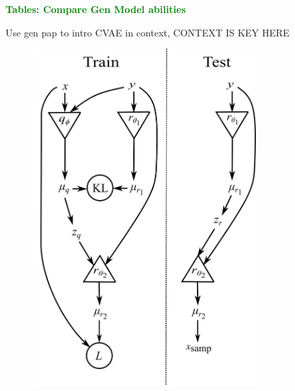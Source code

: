 \documentclass[aps,superscriptaddress,twocolumn,nopreprintnumbers,floatfix,groupedaddress]{revtex4-1}
\newcommand{\figwidth}{8.6cm}
\begin{document}
\textbf{\textcolor{green}{Tables: Compare Gen Model abilities}}

Use gen pap to intro CVAE in context, CONTEXT IS KEY HERE


\begin{figure}
	\centering
	\includegraphics[width=\figwidth]{figs/network_setup.png}
	\caption{}
	\label{fig:vit_flow}
\end{figure}

%
%
%
\end{document}
